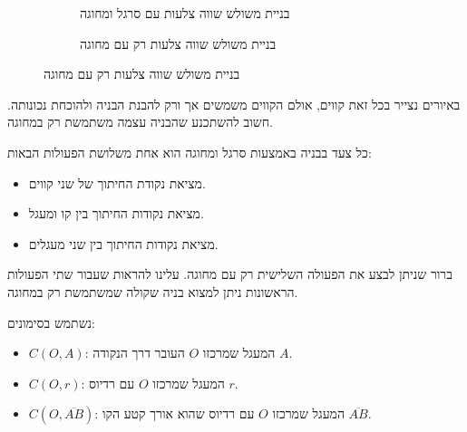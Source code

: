 \begin{figure}[htb]
\begin{center}
\begin{subfigure}{.4\textwidth}
\caption{בניית משולש שווה צלעות עם סרגל ומחוגה}\label{f.compass-equi}
\end{subfigure}
\hspace{3em}
\begin{subfigure}{.4\textwidth}
\caption{בניית משולש שווה צלעות רק עם מחוגה}\label{f.compass-equi-only}
\end{subfigure}
\end{center}
\end{figure}
באיורים נצייר בכל זאת קווים, אולם הקווים משמשים אך ורק להבנת הבניה ולהוכחת נכונותה. חשוב להשתכנע שהבניה עצמה משתמשת רק במחוגה.


כל צעד בבניה באמצעות סרגל ומחוגה הוא אחת משלושת הפעולות הבאות:
\begin{itemize}
\item
מציאת נקודת החיתוך של שני קווים.
\item
מציאת נקודות החיתוך בין קו ומעגל.
\item
מציאת נקודות החיתוך בין שני מעגלים.
\end{itemize}
ברור שניתן לבצע את הפעולה השלישית רק עם מחוגה. עלינו להראות שעבור שתי הפעולות הראשונות ניתן למצוא בניה שקולה שמשתמשת רק במחוגה.


נשתמש בסימונים:
\begin{itemize}
\item $C(O,A)$: 
המעגל שמרכזו
$O$
העובר דרך הנקודה
$A$.
\item $C(O,r)$:
המעגל שמרכזו
$O$
עם רדיוס
$r$.
\item $C(O,\overline{AB})$:
המעגל שמרכזו
$O$
עם רדיוס שהוא אורך קטע הקו
$\overline{AB}$.
\end{itemize}

